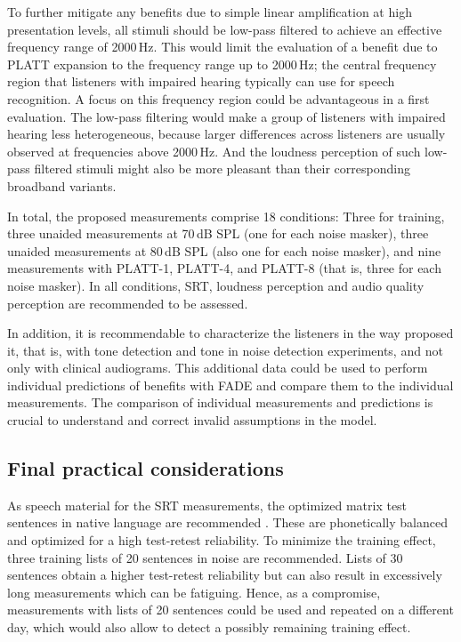 \documentclass[10pt,a4paper,twocolumn]{article}
\begin{document}
To further mitigate any benefits due to simple linear amplification at high presentation levels, all stimuli should be low-pass filtered to achieve an effective frequency range of 2000\,Hz.
%
This would limit the evaluation of a benefit due to PLATT expansion to the frequency range up to 2000\,Hz; the central frequency region that listeners with impaired hearing typically can use for speech recognition.
%
A focus on this frequency region could be advantageous in a first evaluation.
%
The low-pass filtering would make a group of listeners with impaired hearing less heterogeneous, because larger differences across listeners are usually observed at frequencies above 2000\,Hz. 
%
And the loudness perception of such low-pass filtered stimuli might also be more pleasant than their corresponding broadband variants.

In total, the proposed measurements comprise 18 conditions:
%
Three for training, three unaided measurements at 70\,dB SPL (one for each noise masker), three unaided measurements at 80\,dB SPL (also one for each noise masker), and nine measurements with PLATT-1, PLATT-4, and PLATT-8 (that is, three for each noise masker).
%
In all conditions, SRT, loudness perception and audio quality perception are recommended to be assessed.

In addition, it is recommendable to characterize the listeners in the way \cite{schaedler2020a} proposed it, that is, with tone detection and tone in noise detection experiments, and not only with clinical audiograms.
%
This additional data could be used to perform individual predictions of benefits with FADE and compare them to the individual measurements.
%
The comparison of individual measurements and predictions is crucial to 
understand and correct invalid assumptions in the model.

\subsection*{Final practical considerations}
%
As speech material for the SRT measurements, the optimized matrix test sentences in native language are recommended \citep{kollmeier2015}.
%
These are phonetically balanced and optimized for a high test-retest reliability.
%
To minimize the training effect, three training lists of 20 sentences in noise are recommended.
%
Lists of 30 sentences obtain a higher test-retest reliability but can also result in excessively long measurements which can be fatiguing.
%
Hence, as a compromise, measurements with lists of 20 sentences could be used and repeated on a different day, which would also allow to detect a possibly remaining training effect.
\end{document}
